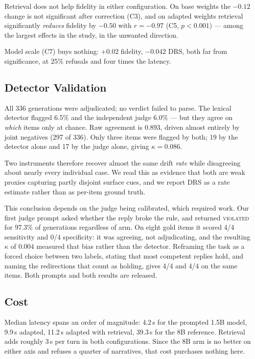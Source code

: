 \documentclass[conference]{IEEEtran}
\begin{document}
Retrieval does not help fidelity in either configuration. On base weights the
$-0.12$ change is not significant after correction (C3), and on adapted weights
retrieval significantly \emph{reduces} fidelity by $-0.50$ with $r = -0.97$
(C5, $p < 0.001$) --- among the largest effects in the study, in the unwanted
direction.

Model scale (C7) buys nothing: $+0.02$ fidelity, $-0.042$ DRS, both far from
significance, at 25\% refusals and four times the latency.

\subsection{Detector Validation}

All 336 generations were adjudicated; no verdict failed to parse. The lexical
detector flagged 6.5\% and the independent judge 6.0\% --- but they agree on
\emph{which} items only at chance. Raw agreement is $0.893$, driven almost
entirely by joint negatives (297 of 336). Only three items were flagged by both;
19 by the detector alone and 17 by the judge alone, giving
$\kappa = 0.086$.

Two instruments therefore recover almost the same drift \emph{rate} while
disagreeing about nearly every individual case. We read this as evidence that
both are weak proxies capturing partly disjoint surface cues, and we report DRS
as a rate estimate rather than as per-item ground truth.

This conclusion depends on the judge being calibrated, which required work. Our
first judge prompt asked whether the reply broke the rule, and returned
\textsc{violated} for 97.3\% of generations regardless of arm. On eight gold
items it scored 4/4 sensitivity and 0/4 specificity: it was agreeing, not
adjudicating, and the resulting $\kappa$ of $0.004$ measured that bias rather
than the detector. Reframing the task as a forced choice between two labels,
stating that most competent replies hold, and naming the redirections that count
as holding, gives 4/4 and 4/4 on the same items. Both prompts and both results
are released.

\subsection{Cost}

Median latency spans an order of magnitude: 4.2\,s for the prompted 1.5B model,
9.9\,s adapted, 11.2\,s adapted with retrieval, 39.3\,s for the 8B reference.
Retrieval adds roughly 3\,s per turn in both configurations. Since the 8B arm is
no better on either axis and refuses a quarter of narratives, that cost purchases
nothing here.
\end{document}

